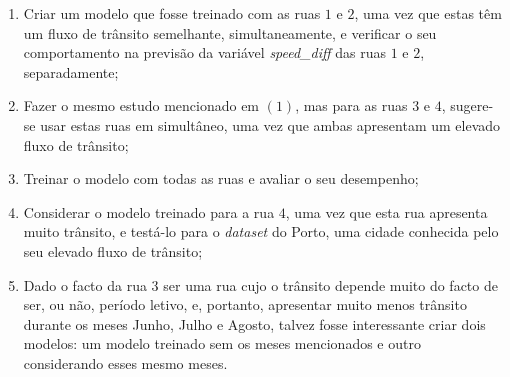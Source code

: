 \documentclass[a4paper, 12pt]{article}
\begin{document}
\begin{enumerate}
	\item Criar um modelo que fosse treinado com as ruas $1$ e $2$, uma vez que estas têm um fluxo de trânsito semelhante, simultaneamente, e verificar o seu comportamento na previsão da variável \textit{speed\_diff} das ruas $1$ e $2$, separadamente;
	\item Fazer o mesmo estudo mencionado em $(1)$, mas para as ruas $3$ e $4$, sugere-se usar estas ruas em simultâneo, uma vez que ambas apresentam um elevado fluxo de trânsito;
	\item Treinar o modelo com todas as ruas e avaliar o seu desempenho;
	\item Considerar o modelo treinado para a rua $4$, uma vez que esta rua apresenta muito trânsito, e testá-lo para o \textit{dataset} do Porto, uma cidade conhecida pelo seu elevado fluxo de trânsito;
	\item Dado o facto da rua $3$ ser uma rua cujo o trânsito depende muito do facto de ser, ou não, período letivo, e, portanto, apresentar muito menos trânsito durante os meses Junho, Julho e Agosto, talvez fosse interessante criar dois modelos: um modelo treinado sem os meses mencionados e outro considerando esses mesmo meses.
\end{enumerate}
\end{document}
